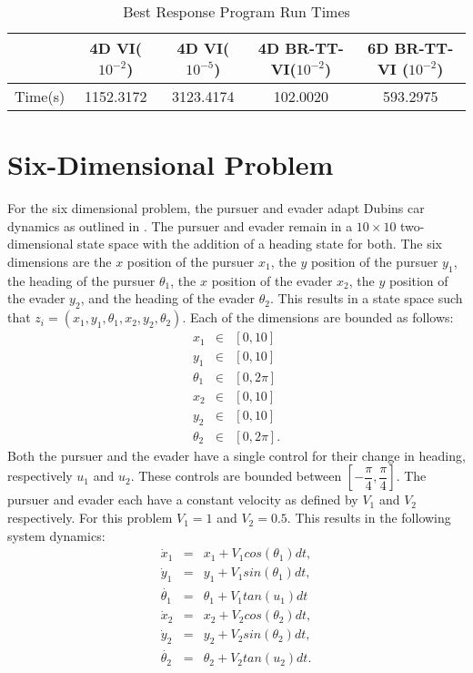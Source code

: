 \begin{table}
\caption{Best Response Program Run Times}
\label{BRPRun}
\begin{center}
\begin{tabular}{|r|c|c|c|c|}\hline
  & 4D VI($10^{-2}$) & 4D VI($10^{-5}$) & 4D BR-TT-VI($10^{-2}$) & 6D BR-TT-VI ($10^{-2}$)\\\hline
Time(s) & 1152.3172 & 3123.4174 & 102.0020 & 593.2975 \\\hline

\end{tabular}
\end{center}
\end{table}  

\section{Six-Dimensional Problem}
For the six dimensional problem, the pursuer and evader adapt Dubins car dynamics as outlined in \cite{dubins}.  The pursuer and evader remain in a $10 \times 10$ two-dimensional  state space with the addition of a heading state for both. The six dimensions are the $x$ position of the pursuer $x_1$, the $y$ position of the pursuer $y_1$, the heading of the pursuer $\theta_1$, the $x$ position of the evader $x_2$, the $y$ position of the evader $y_2$, and the heading of the evader $\theta_2$. This results in a state space such that $z_i = (x_1,y_1,\theta_1,x_2,y_2,\theta_2)$. Each of the dimensions are bounded as follows:
\begin{eqnarray*}
x_1 & \in & [0,10]\\
y_1 & \in & [0,10]\\
\theta_1 & \in & [0,2\pi]\\
x_2 & \in & [0,10]\\
y_2 & \in & [0,10]\\
\theta_2 & \in & [0,2\pi].
\end{eqnarray*} 
Both the pursuer and the evader have a single control for their change in heading, respectively $u_1$ and $u_2$. These controls are bounded between $[-\dfrac{\pi}{4},\dfrac{\pi}{4}]$. The pursuer and evader each have a constant velocity as defined by $V_1$ and $V_2$ respectively. For this problem $V_1 = 1$ and $V_2 = 0.5$. This results in the following system dynamics:
\begin{eqnarray}\label{eqns2}
\dot{x}_1 & = & x_1 +V_1cos(\theta_1)dt,\\
\dot{y}_1 & = & y_1 +V_1sin(\theta_1)dt,\\
\dot{\theta_1}  & = & \theta_1 + V_1tan(u_1)dt\\
\dot{x}_2 & = & x_2 +V_2cos(\theta_2)dt,\\
\dot{y}_2 & = & y_2 +V_2sin(\theta_2)dt,\\
\dot{\theta_2}  & = & \theta_2 + V_2tan(u_2)dt.
\end{eqnarray}
